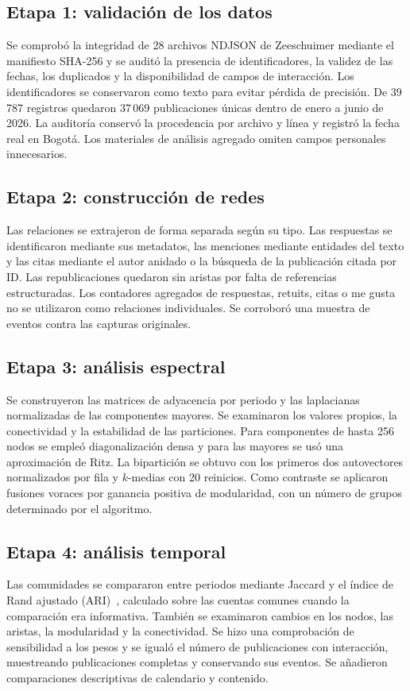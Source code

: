 \documentclass[journal]{IEEEtran}
\begin{document}
\subsection{Etapa 1: validación de los datos}
Se comprobó la integridad de 28 archivos NDJSON de Zeeschuimer mediante el manifiesto SHA-256 y se auditó la presencia de identificadores, la validez de las fechas, los duplicados y la disponibilidad de campos de interacción. Los identificadores se conservaron como texto para evitar pérdida de precisión. De 39\,787 registros quedaron 37\,069 publicaciones únicas dentro de enero a junio de 2026. La auditoría conservó la procedencia por archivo y línea y registró la fecha real en Bogotá. Los materiales de análisis agregado omiten campos personales innecesarios.

\subsection{Etapa 2: construcción de redes}
Las relaciones se extrajeron de forma separada según su tipo. Las respuestas se identificaron mediante sus metadatos, las menciones mediante entidades del texto y las citas mediante el autor anidado o la búsqueda de la publicación citada por ID. Las republicaciones quedaron sin aristas por falta de referencias estructuradas. Los contadores agregados de respuestas, retuits, citas o me gusta no se utilizaron como relaciones individuales. Se corroboró una muestra de eventos contra las capturas originales.

\subsection{Etapa 3: análisis espectral}
Se construyeron las matrices de adyacencia por periodo y las laplacianas normalizadas de las componentes mayores. Se examinaron los valores propios, la conectividad y la estabilidad de las particiones. Para componentes de hasta 256 nodos se empleó diagonalización densa y para las mayores se usó una aproximación de Ritz. La bipartición se obtuvo con los primeros dos autovectores normalizados por fila y $k$-medias con 20 reinicios. Como contraste se aplicaron fusiones voraces por ganancia positiva de modularidad, con un número de grupos determinado por el algoritmo.

\subsection{Etapa 4: análisis temporal}
Las comunidades se compararon entre periodos mediante Jaccard y el índice de Rand ajustado (ARI)~\cite{hubert}, calculado sobre las cuentas comunes cuando la comparación era informativa. También se examinaron cambios en los nodos, las aristas, la modularidad y la conectividad. Se hizo una comprobación de sensibilidad a los pesos y se igualó el número de publicaciones con interacción, muestreando publicaciones completas y conservando sus eventos. Se añadieron comparaciones descriptivas de calendario y contenido.
\end{document}
